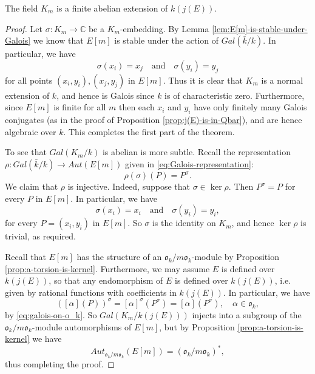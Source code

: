 \begin{thm}
  \label{thm:K_m-is-abelian-over-k(j(E))}
  The field $K_{m}$ is a finite abelian extension of $k(j(E))$.
\end{thm}
\begin{proof}
  Let $\sigma : K_{m} \rightarrow \mathbb{C}$ be a $K_{m}$-embedding.  By Lemma
  \ref{lem:E[m]-is-stable-under-Galois} we know that $E[m]$ is stable under the
  action of $Gal(\bar{k} / k)$.  In particular, we have
  \begin{equation*}
    \sigma(x_{i}) = x_{j} \quad \text{and} \quad \sigma(y_{i}) = y_{j}
  \end{equation*}
  for all points $(x_{i},y_{i}), (x_{j},y_{j})$ in $E[m]$.  Thus it is clear that
  $K_{m}$ is a normal extension of $k$, and hence is Galois since $k$ is of
  characteristic zero.  Furthermore, since $E[m]$ is finite for all $m$ then each
  $x_{i}$ and $y_{i}$ have only finitely many Galois conjugates (as in the proof of
  Proposition \ref{prop:j(E)-is-in-Qbar}), and are hence algebraic over $k$.  This
  completes the first part of the theorem.

  To see that $Gal(K_{m}/k)$ is abelian is more subtle.  Recall the representation
  $\rho : Gal(\bar{k} / k) \rightarrow Aut(E[m])$ given in
  \eqref{eq:Galois-representation}:
  \begin{equation*}
    \rho (\sigma) (P) = P^{\sigma}.
  \end{equation*}
  We claim that $\rho$ is injective.  Indeed, suppose that $\sigma \in \ker{\rho}$.
  Then $P^{\sigma} = P$ for every $P$ in $E[m]$.  In particular, we have
  \begin{equation*}
    \sigma (x_{i}) = x_{i} \quad \text{and} \quad \sigma (y_{i}) = y_{i},
  \end{equation*}
  for every $P = (x_{i},y_{i})$ in $E[m]$.  So $\sigma$ is the identity on $K_{m}$,
  and hence $\ker{\rho}$ is trivial, as required.

  Recall that $E[m]$ has the structure of an $\mathfrak{o}_{k} / m
  \mathfrak{o}_{k}$-module by Proposition \ref{prop:a-torsion-is-kernel}.
  Furthermore, we may assume $E$ is defined over $k(j(E))$, so that any endomorphism
  of $E$ is defined over $k(j(E))$, i.e. given by rational functions with
  coefficients in $k(j(E))$.  In particular, we have
  \begin{equation*}
    ([\alpha](P))^{\sigma} = [\alpha]^{\sigma}(P^{\sigma}) = [\alpha](P^{\sigma}),
    \quad \alpha \in \mathfrak{o}_{k},
  \end{equation*}
  by \eqref{eq:galois-on-o_k}. So $Gal(K_{m}/k(j(E)))$ injects into a subgroup of the $\mathfrak{o}_{k} / m
  \mathfrak{o}_{k}$-module automorphisms of $E[m]$, but by Proposition
  \ref{prop:a-torsion-is-kernel} we have
  \begin{equation*}
    Aut_{\mathfrak{o}_{k} / m \mathfrak{o}_{k}}(E[m]) = (\mathfrak{o}_{k} / m \mathfrak{o}_{k})^{*},
  \end{equation*}
  thus completing the proof.
\end{proof}
